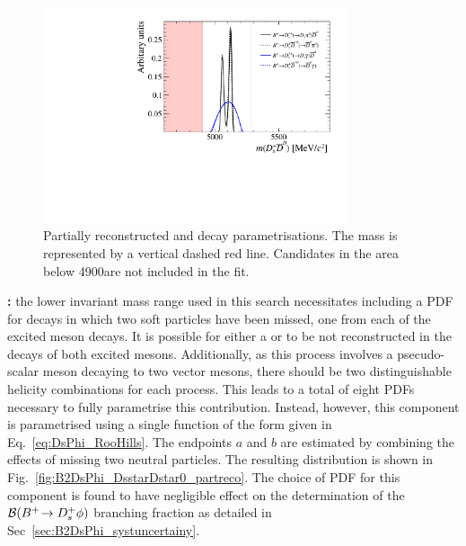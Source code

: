 \begin{figure}[!h]
    \centering
    \includegraphics[width=0.80\textwidth]{figs/B2DsPhi/DsD0_part_reco_Shapes.pdf}
    \caption{Partially reconstructed \decay{\Bp}{\Dsp\Dstarzb} and \decay{\Bp}{\Dssp\Dzb} decay parametrisations. The \Bp mass is represented by a vertical dashed red line. Candidates in the area below 4900\mevcc are not included in the fit.}
    \label{fig:B2DsPhi_DsD0_partreco}   
\end{figure}


\begin{description}

\item \textbf{\decay{\Bp}{\Dssp\Dstarzb}:} the lower invariant mass range used in this search necessitates including a PDF for \decay{\Bp}{\Dssp\Dstarzb} decays in which two soft particles have been missed, one from each of the excited \D meson decays. It is possible for either a \piz or \Pgamma to be not reconstructed in the decays of both excited \D mesons. Additionally, as this process involves a psecudo-scalar meson decaying to two vector mesons, there should be two distinguishable helicity combinations for each process. This leads to a total of eight PDFs necessary to fully parametrise this contribution. Instead, however, this component is parametrised using a single function of the form given in Eq.~\ref{eq:DsPhi_RooHills}. The endpoints $a$ and $b$ are estimated by combining the effects of missing two neutral particles. The resulting distribution is shown in Fig.~\ref{fig:B2DsPhi_DsstarDstar0_partreco}.
The choice of PDF for this component is found to have negligible effect on the determination of the ${\mathcal{B}}({{{B}^+}}\!\rightarrow {\ensuremath{{D}^+_{s}}}\phi)$ branching fraction as detailed in Sec~\ref{sec:B2DsPhi_systuncertainy}.

\end{description}

